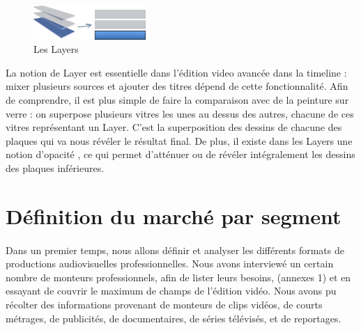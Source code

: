 \begin{figure}

  \begin{center}

    \vspace{-20pt} \includegraphics[width=0.38\textwidth]{images/layers}

  \end{center} \vspace{-20pt} \caption{Les Layers} \label{Yes}

\end{figure}

La notion de Layer est essentielle dans l'édition video avancée dans
la timeline : mixer plusieurs sources et ajouter des titres dépend de
cette fonctionnalité. Afin de comprendre, il est plus simple de faire
la comparaison avec de la peinture sur verre : on superpose plusieurs
vitres les unes au dessus des autres, chacune de ces vitres représentant
un Layer. C'est la superposition des dessins de chacune des plaques
qui va nous révéler le résultat final. De plus, il existe dans les
Layers une notion d'opacité , ce qui permet d'atténuer ou de révéler
intégralement les dessins des plaques inférieures.

\newpage\section{Définition du marché par segment}

\paragraph{}

Dans un premier temps, nous allons définir et analyser les différents
formats de productions audiovisuelles professionnelles. Nous avons
interviewé un certain nombre de monteurs professionnels, afin de lister
leurs besoins, (annexes 1) et en essayant de couvrir le maximum de champs
de l'édition vidéo. Nous avons pu récolter des informations provenant
de monteurs de clips vidéos, de courts métrages, de publicités,
de documentaires, de séries télévisés, et de reportages.

\paragraph{}

